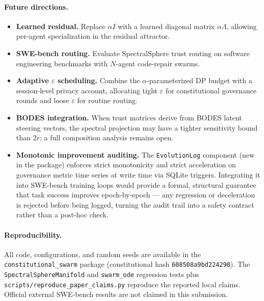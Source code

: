 \paragraph{Future directions.}
\begin{itemize}
  \item \textbf{Learned residual.}  Replace $\alpha I$ with a learned diagonal matrix
    $\alpha \Lambda$, allowing per-agent specialization in the residual attractor.
  \item \textbf{SWE-bench routing.}  Evaluate SpectralSphere trust routing on software
    engineering benchmarks with $N$-agent code-repair swarms.
  \item \textbf{Adaptive $\varepsilon$ scheduling.}  Combine the $\alpha$-parameterized DP
    budget with a session-level privacy account, allocating tight $\varepsilon$ for
    constitutional governance rounds and loose $\varepsilon$ for routine routing.
  \item \textbf{BODES integration.}  When trust matrices derive from BODES latent
    steering vectors, the spectral projection may have a tighter sensitivity bound than
    $2r$; a full composition analysis remains open.
  \item \textbf{Monotonic improvement auditing.}  The \texttt{EvolutionLog} component
    (new in the package) enforces strict monotonicity and strict acceleration on
    governance metric time series at write time via SQLite triggers.  Integrating it
    into SWE-bench training loops would provide a formal, structural guarantee that
    task success improves epoch-by-epoch --- any regression or deceleration is rejected
    before being logged, turning the audit trail into a safety contract rather than a
    post-hoc check.
\end{itemize}

\paragraph{Reproducibility.}
All code, configurations, and random seeds are available in the
\texttt{constitutional\_swarm} package (constitutional hash \texttt{608508a9bd224290}).
The \texttt{SpectralSphereManifold} and \texttt{swarm\_ode} regression tests plus
\texttt{scripts/reproduce\_paper\_claims.py} reproduce the reported local claims.
Official external SWE-bench results are not claimed in this submission.
